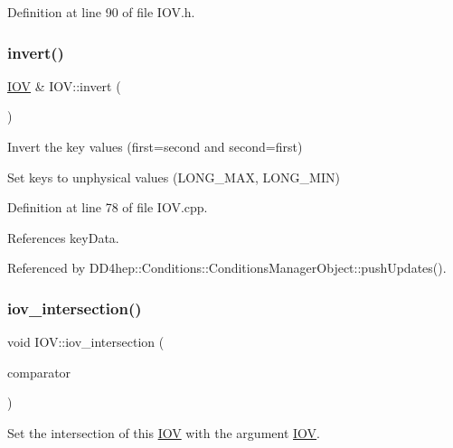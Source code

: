 Definition at line 90 of file I\+O\+V.\+h.

\hypertarget{class_d_d4hep_1_1_i_o_v_a5407ab1da0910ee18ca80dfa6985d0af}{}\label{class_d_d4hep_1_1_i_o_v_a5407ab1da0910ee18ca80dfa6985d0af} 
\subsubsection{\texorpdfstring{invert()}{invert()}}
{\footnotesize\ttfamily \hyperlink{class_d_d4hep_1_1_i_o_v}{I\+OV} \& I\+O\+V\+::invert (\begin{DoxyParamCaption}{ }\end{DoxyParamCaption})}



Invert the key values (first=second and second=first) 

Set keys to unphysical values (L\+O\+N\+G\+\_\+\+M\+AX, L\+O\+N\+G\+\_\+\+M\+IN) 

Definition at line 78 of file I\+O\+V.\+cpp.



References key\+Data.



Referenced by D\+D4hep\+::\+Conditions\+::\+Conditions\+Manager\+Object\+::push\+Updates().

\hypertarget{class_d_d4hep_1_1_i_o_v_ae6f8261feefa4678c0842d43946d146d}{}\label{class_d_d4hep_1_1_i_o_v_ae6f8261feefa4678c0842d43946d146d} 
\subsubsection{\texorpdfstring{iov\+\_\+intersection()}{iov\_intersection()}\hspace{0.1cm}{\footnotesize\ttfamily [1/2]}}
{\footnotesize\ttfamily void I\+O\+V\+::iov\+\_\+intersection (\begin{DoxyParamCaption}\item[{const \hyperlink{class_d_d4hep_1_1_i_o_v}{I\+OV} \&}]{comparator }\end{DoxyParamCaption})}



Set the intersection of this \hyperlink{class_d_d4hep_1_1_i_o_v}{I\+OV} with the argument \hyperlink{class_d_d4hep_1_1_i_o_v}{I\+OV}. 



